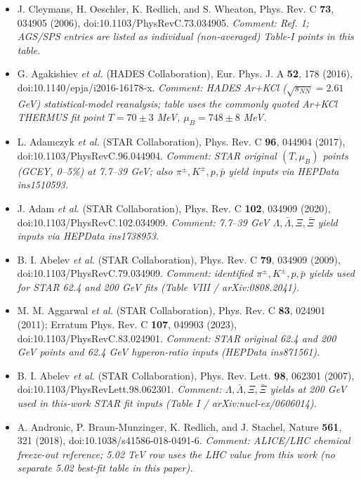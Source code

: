 \documentclass[10pt]{article}
\begin{document}
\begin{itemize}
\item [1] J. Cleymans, H. Oeschler, K. Redlich, and S. Wheaton, Phys. Rev. C \textbf{73}, 034905 (2006), doi:10.1103/PhysRevC.73.034905. \textit{Comment: Ref. 1; AGS/SPS entries are listed as individual (non-averaged) Table-I points in this table.}
\item [2] G. Agakishiev \textit{et al.} (HADES Collaboration), Eur. Phys. J. A \textbf{52}, 178 (2016), doi:10.1140/epja/i2016-16178-x. \textit{Comment: HADES Ar+KCl ($\sqrt{s_{NN}}=2.61$ GeV) statistical-model reanalysis; table uses the commonly quoted Ar+KCl THERMUS fit point $T=70\pm3$ MeV, $\mu_B=748\pm8$ MeV.}
\item [3] L. Adamczyk \textit{et al.} (STAR Collaboration), Phys. Rev. C \textbf{96}, 044904 (2017), doi:10.1103/PhysRevC.96.044904. \textit{Comment: STAR original $(T,\mu_B)$ points (GCEY, 0--5\%) at 7.7--39 GeV; also $\pi^\pm,K^\pm,p,\bar{p}$ yield inputs via HEPData ins1510593.}
\item [4] J. Adam \textit{et al.} (STAR Collaboration), Phys. Rev. C \textbf{102}, 034909 (2020), doi:10.1103/PhysRevC.102.034909. \textit{Comment: 7.7--39 GeV $\Lambda,\bar{\Lambda},\Xi,\bar{\Xi}$ yield inputs via HEPData ins1738953.}
\item [5] B. I. Abelev \textit{et al.} (STAR Collaboration), Phys. Rev. C \textbf{79}, 034909 (2009), doi:10.1103/PhysRevC.79.034909. \textit{Comment: identified $\pi^\pm,K^\pm,p,\bar{p}$ yields used for STAR 62.4 and 200 GeV fits (Table VIII / arXiv:0808.2041).}
\item [6] M. M. Aggarwal \textit{et al.} (STAR Collaboration), Phys. Rev. C \textbf{83}, 024901 (2011); Erratum Phys. Rev. C \textbf{107}, 049903 (2023), doi:10.1103/PhysRevC.83.024901. \textit{Comment: STAR original 62.4 and 200 GeV points and 62.4 GeV hyperon-ratio inputs (HEPData ins871561).}
\item [7] B. I. Abelev \textit{et al.} (STAR Collaboration), Phys. Rev. Lett. \textbf{98}, 062301 (2007), doi:10.1103/PhysRevLett.98.062301. \textit{Comment: $\Lambda,\bar{\Lambda},\Xi,\bar{\Xi}$ yields at 200 GeV used in this-work STAR fit inputs (Table I / arXiv:nucl-ex/0606014).}
\item [8] A. Andronic, P. Braun-Munzinger, K. Redlich, and J. Stachel, Nature \textbf{561}, 321 (2018), doi:10.1038/s41586-018-0491-6. \textit{Comment: ALICE/LHC chemical freeze-out reference; 5.02 TeV row uses the LHC value from this work (no separate 5.02 best-fit table in this paper).}
\end{itemize}
\end{document}
